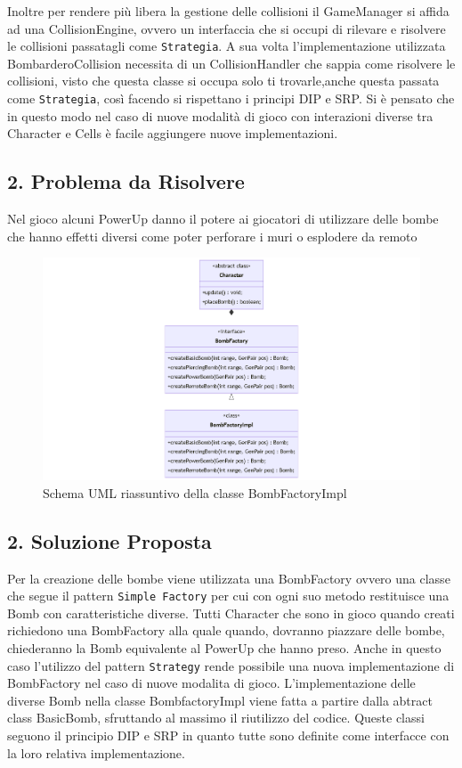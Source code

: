 \documentclass[a4paper,12pt]{report}
\begin{document}
\par
Inoltre per rendere più libera la gestione delle collisioni il GameManager si affida ad una CollisionEngine, ovvero un interfaccia che si occupi di rilevare e risolvere le collisioni passatagli come \verb|Strategia|.
A sua volta l'implementazione utilizzata BombarderoCollision necessita di un CollisionHandler che sappia come risolvere le collisioni, visto che questa classe si occupa solo ti trovarle,anche questa passata come \verb|Strategia|, così facendo si rispettano i principi DIP e SRP.
Si è pensato che in questo modo nel caso di nuove modalità di gioco con interazioni diverse tra Character e Cells è facile aggiungere nuove implementazioni.

\subsection*{2. Problema da Risolvere}
\par
Nel gioco alcuni PowerUp danno il potere ai giocatori di utilizzare delle bombe che hanno effetti diversi come poter perforare i muri o esplodere da remoto

\begin{figure}[H]
\centering{}
\includegraphics[width=\textwidth]{img/bombFactory.png}
\caption{Schema UML riassuntivo della classe BombFactoryImpl}
\end{figure}

\subsection*{2. Soluzione Proposta}
\par
Per la creazione delle bombe viene utilizzata una BombFactory ovvero una classe che segue il pattern \verb|Simple Factory| per cui con ogni suo metodo restituisce una Bomb con caratteristiche diverse. Tutti Character che sono in gioco quando creati richiedono una BombFactory alla quale quando, dovranno piazzare delle bombe, chiederanno la Bomb equivalente al PowerUp che hanno preso. Anche in questo caso l'utilizzo del pattern \verb|Strategy| rende possibile una nuova implementazione di BombFactory nel caso di nuove modalita di gioco.  L'implementazione delle diverse Bomb nella classe BombfactoryImpl viene fatta a partire dalla abtract class BasicBomb, sfruttando al massimo il riutilizzo del codice.
Queste classi seguono il principio DIP e SRP in quanto tutte sono definite come interfacce con la loro relativa implementazione.
\end{document}
